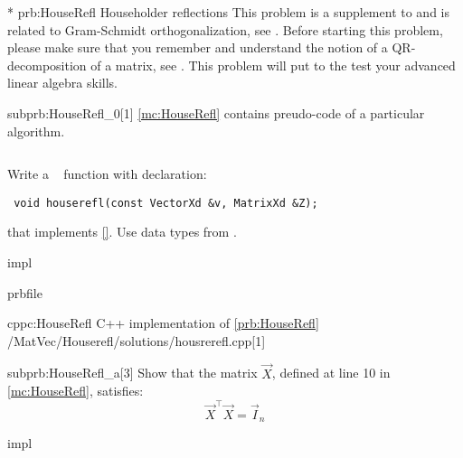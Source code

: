 \begin{problem}*
  {prb:HouseRefl}
  {Householder reflections}
  {
    This problem is a
    supplement to  and is related to Gram-Schmidt
    orthogonalization, see .
    Before starting this problem, please make sure that you
    remember and understand the notion of a QR-decomposition
    of a matrix, see . This problem will put to
    the test your advanced linear algebra skills.
  }

  \begin{subproblem}{subprb:HouseRefl_0}[1]
    \cref{mc:HouseRefl} contains preudo-code of a particular
    algorithm.
  \begin{lstlisting}

  \end{lstlisting}
  Write a \Cpp~ function with declaration:
  \begin{lstlisting}
 void houserefl(const VectorXd &v, MatrixXd &Z);
  \end{lstlisting}
  that implements \ref{}.
  Use data types from \eigen{}.

  \begin{samwriteprbpart}{impl}
    \begin{writeverbatim}{prbfile}
      \begin{samsolution}
        \begin{samcode}[C++-code]{cppc:HouseRefl}
          {C++ implementation of \ref{prb:HouseRefl}}
          \samincludecpp
          {\codes/MatVec/Houserefl/solutions/housrerefl.cpp}[1]
        \end{samcode}
      \end{samsolution}
    \end{writeverbatim}
  \end{samwriteprbpart}
  \end{subproblem}

  \begin{subproblem}{subprb:HouseRefl_a}[3]
  Show that the matrix $\vec{X}$,  defined at line 10 in
  \autoref{mc:HouseRefl}, satisfies:
  \[
    \vec{X}^\top \vec{X} = \vec{I}_n
  \]
  \begin{samwriteprbpart}{impl}
    \begin{writeverbatim}{prbfile
        \begin{samhint}
          Notice that $\norm{\vec{q}}^2 = 1$.
        \end{samhint}
    \end{writeverbatim}
  \end{samwriteprbpart}


\end{subproblem}
\end{problem}
